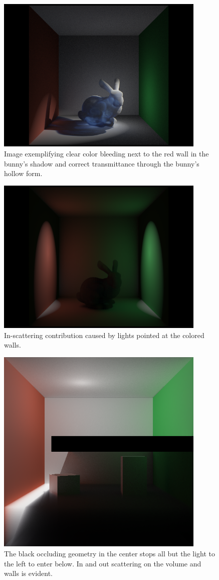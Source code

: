 \documentclass[runningheads]{llncs}
\begin{document}
\begin{figure}[h!]
    \centering
    \includegraphics[width=100mm]{img/bunny_spot/spot_right.png}
    \caption{Image exemplifying clear color bleeding next to the red wall in the bunny's shadow and correct transmittance through the bunny's hollow form.}
\end{figure}

\begin{figure}[h!]
    \centering
    \includegraphics[width=100mm]{img/two_light_bunny_indir.png}
    \caption{In-scattering contribution caused by lights pointed at the colored walls.}
\end{figure}

\begin{figure}[h!]
    \centering
    \includegraphics[width=100mm]{img/one_side.png}
    \caption{The black occluding geometry in the center stops all but the light to the left to enter below.  In and out scattering on the volume and walls is evident.}
\end{figure}
\end{document}
